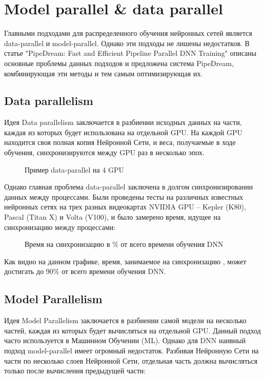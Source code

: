 
\newpage
\section{Model parallel \& data parallel}
\indent\setlength{\parindent}{1em} 
Главными подходами для распределенного обучения нейронных сетей является data-parallel и model-parallel. Однако эти подходы не лишены недостатков. В статье "PipeDream: Fast and Efficient Pipeline Parallel DNN Training"\cite{pipedream} описаны основные проблемы данных подходов и предложена система PipeDream, комбинирующая эти методы и тем самым оптимизирующая их.

\subsection{Data parallelism}
Идея Data parallelism заключается в разбиении исходных данных на части, каждая из которых будет использована на отдельной GPU. На каждой GPU находится своя полная копия Нейронной Сети, и веса, получаемые в ходе обучения, синхронизируются между GPU раз в несколько эпох.


\begin{figure}[h]%
	\centering
	\caption{Пример data-parallel на 4 GPU}
	\label{framework} %
\end{figure}

\indent\setlength{\parindent}{1em} 
Однако главная проблема data-parallel заключена в долгом синхронизировании данных между процессами. Были проведены тесты на различных известных нейронных сетях на трех разных видеокартах NVIDIA GPU -- Kepler (K80), Pascal (Titan X) и Volta (V100), и было замерено время, идущее на синхронизацию между процессами:

\begin{figure}[h]%
	\centering
	\caption{Время на синхронизацию в \% от всего времени обучения DNN}
	\label{framework} %
\end{figure}

\indent\setlength{\parindent}{1em} 
Как видно на данном графике, время, занимаемое на синхронизацию , может достигать до 90\% от всего времени обучения DNN.

\newpage
\subsection{Model Parallelism}
Идея Model Parallelism заключается в разбиении самой модели на несколько частей, каждая из которых будет вычисляться на отдельной GPU. Данный подход часто используется в Машинном Обучении (ML). Однако для DNN наивный подход model-parallel имеет огромный недостаток. Разбивая Нейронную Сети на части по несколько слоев Нейронной Сети, отдельная часть должна вычисляться только после вычисления предыдущей части:

